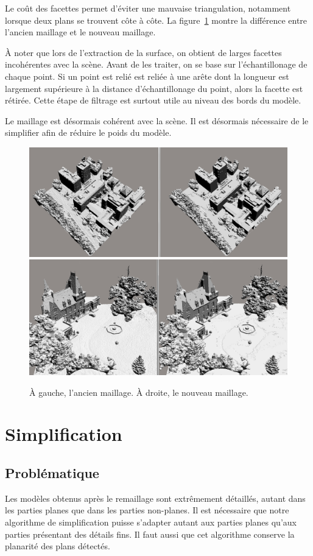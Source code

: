 \documentclass[12pt, twoside]{article}
\let\oldsection\section
\def\section{\cleardoublepage\oldsection}
\begin{document}
Le coût des facettes permet d'éviter une mauvaise triangulation, notamment lorsque deux plans se trouvent côte à côte. La figure~\ref{fig:avap} montre la différence entre l'ancien maillage et le nouveau maillage.

À noter que lors de l'extraction de la surface, on obtient de larges facettes incohérentes avec la scène. Avant de les traiter, on se base sur l'échantillonage de chaque point. Si un point est relié est reliée à une arête dont la longueur est largement supérieure à la distance d'échantillonage du point, alors la facette est rétirée. Cette étape de filtrage est surtout utile au niveau des bords du modèle.

Le maillage est désormais cohérent avec la scène. Il est désormais nécessaire de le simplifier afin de réduire le poids du modèle.

\begin{figure}[h]
\centering
\includegraphics[scale=0.35]{Comparo4.png} \includegraphics[scale=0.34]{Comparo5.png} 
\caption{\label{fig:avap} À gauche, l'ancien maillage. À droite, le nouveau maillage.}
\end{figure}

\section{Simplification}
\subsection{Problématique}
Les modèles obtenus après le remaillage sont extrêmement détaillés, autant dans les parties planes que dans les parties non-planes. Il est nécessaire que notre algorithme de simplification puisse s'adapter autant aux parties planes qu'aux parties présentant des détails fins. Il faut aussi que cet algorithme conserve la planarité des plans détectés.
\end{document}
